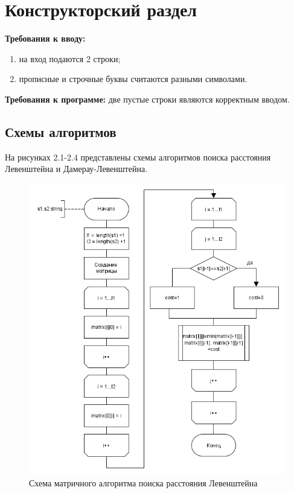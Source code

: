 \chapter{Конструкторский раздел}
\label{cha:design}
\textbf{Требования к вводу:}
\begin{enumerate}[1)]
	\item на вход подаются 2 строки;
	\item прописные и строчные буквы считаются разными символами.
\end{enumerate}
\textbf{Требования к программе:} две пустые строки являются корректным вводом.
\section{Схемы алгоритмов}
На рисунках 2.1-2.4 представлены схемы алгоритмов поиска расстояния Левенштейна и Дамерау-Левенштейна.\\
\label{sec:schemes}
\begin{figure}[H]
	\centering
	\includegraphics[width=0.6\linewidth]{src/Levenstein_m}
	\caption{Схема матричного алгоритма поиска расстояния Левенштейна}
	\label{fig:levensteinm}
\end{figure}
